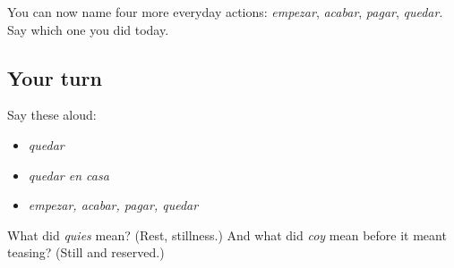 \begin{grammarlens}[title={What you've built}]
You can now name four more everyday actions: \emph{empezar}, \emph{acabar}, \emph{pagar}, \emph{quedar}. Say which one you did today.
\end{grammarlens}

\subsection*{Your turn}
Say these aloud:

\begin{itemize}
\raggedright
  \item \emph{quedar}
  \item \emph{quedar en casa}
  \item \emph{empezar, acabar, pagar, quedar}
\end{itemize}

\begin{tcolorbox}[breakable,colback=teal!4,colframe=teal!35!black,title={Before you move on}]
What did \emph{quies} mean? (Rest, stillness.) And what did \emph{coy} mean before it meant teasing? (Still and reserved.)
\end{tcolorbox}
